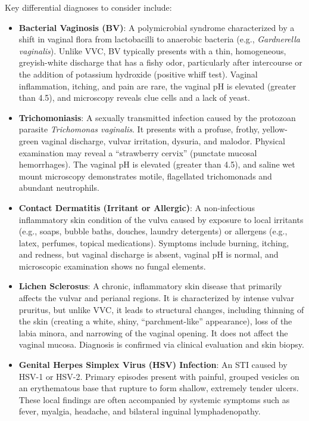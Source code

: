 Key differential diagnoses to consider include:
\begin{itemize}
    \item \textbf{Bacterial Vaginosis (BV)}: A polymicrobial syndrome characterized by a shift in vaginal flora from lactobacilli to anaerobic bacteria (e.g., \textit{Gardnerella vaginalis}). Unlike VVC, BV typically presents with a thin, homogeneous, greyish-white discharge that has a fishy odor, particularly after intercourse or the addition of potassium hydroxide (positive whiff test). Vaginal inflammation, itching, and pain are rare, the vaginal pH is elevated (greater than 4.5), and microscopy reveals clue cells and a lack of yeast.
    \item \textbf{Trichomoniasis}: A sexually transmitted infection caused by the protozoan parasite \textit{Trichomonas vaginalis}. It presents with a profuse, frothy, yellow-green vaginal discharge, vulvar irritation, dysuria, and malodor. Physical examination may reveal a ``strawberry cervix'' (punctate mucosal hemorrhages). The vaginal pH is elevated (greater than 4.5), and saline wet mount microscopy demonstrates motile, flagellated trichomonads and abundant neutrophils.
    \item \textbf{Contact Dermatitis (Irritant or Allergic)}: A non-infectious inflammatory skin condition of the vulva caused by exposure to local irritants (e.g., soaps, bubble baths, douches, laundry detergents) or allergens (e.g., latex, perfumes, topical medications). Symptoms include burning, itching, and redness, but vaginal discharge is absent, vaginal pH is normal, and microscopic examination shows no fungal elements.
    \item \textbf{Lichen Sclerosus}: A chronic, inflammatory skin disease that primarily affects the vulvar and perianal regions. It is characterized by intense vulvar pruritus, but unlike VVC, it leads to structural changes, including thinning of the skin (creating a white, shiny, ``parchment-like'' appearance), loss of the labia minora, and narrowing of the vaginal opening. It does not affect the vaginal mucosa. Diagnosis is confirmed via clinical evaluation and skin biopsy.
    \item \textbf{Genital Herpes Simplex Virus (HSV) Infection}: An STI caused by HSV-1 or HSV-2. Primary episodes present with painful, grouped vesicles on an erythematous base that rupture to form shallow, extremely tender ulcers. These local findings are often accompanied by systemic symptoms such as fever, myalgia, headache, and bilateral inguinal lymphadenopathy.

\end{itemize}
